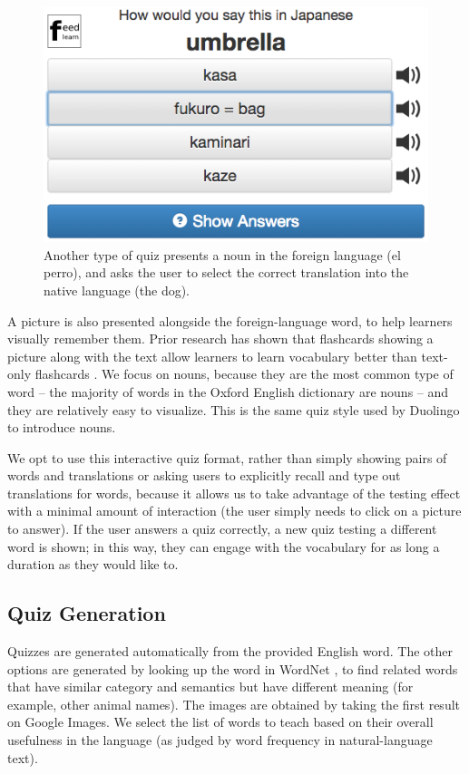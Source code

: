 \documentclass{chi-ext}
\begin{document}
\begin{figure}
\centering
\includegraphics[width=2.0\columnwidth]{quiz2}
\caption{Another type of quiz presents a noun in the foreign language (el perro), and asks the user to select the correct translation into the native language (the dog).}
\label{fig:quiz2}
\end{figure}

A picture is also presented alongside the foreign-language word, to help learners visually remember them. Prior research has shown that flashcards showing a picture along with the text allow learners to learn vocabulary better than text-only flashcards \cite{multimediavocabulary}. We focus on nouns, because they are the most common type of word -- the majority of words in the Oxford English dictionary are nouns \cite{microlearning} -- and they are relatively easy to visualize. This is the same quiz style used by Duolingo to introduce nouns.

We opt to use this interactive quiz format, rather than simply showing pairs of words and translations or asking users to explicitly recall and type out translations for words, because it allows us to take advantage of the testing effect with a minimal amount of interaction (the user simply needs to click on a picture to answer). If the user answers a quiz correctly, a new quiz testing a different word is shown; in this way, they can engage with the vocabulary for as long a duration as they would like to.

\subsection{Quiz Generation}

Quizzes are generated automatically from the provided English word. The other options are generated by looking up the word in WordNet \cite{wordnet}, to find related words that have similar category and semantics but have different meaning (for example, other animal names). The images are obtained by taking the first result on Google Images. We select the list of words to teach based on their overall usefulness in the language (as judged by word frequency in natural-language text).
\end{document}

